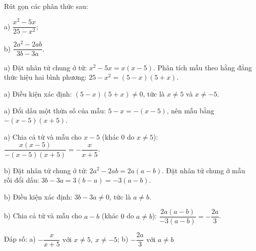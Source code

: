 \begin{problem}[8DS-PS-037]
Rút gọn các phân thức sau:

a) $\dfrac{x^2 - 5x}{25 - x^2}$;

b) $\dfrac{2a^2 - 2ab}{3b - 3a}$.

\begin{solution}
a) Đặt nhân tử chung ở tử: $x^2 - 5x = x(x - 5)$. Phân tích mẫu theo hằng đẳng thức hiệu hai bình phương: $25 - x^2 = (5 - x)(5 + x)$.

a) Điều kiện xác định: $(5 - x)(5 + x) \neq 0$, tức là $x \neq 5$ và $x \neq -5$.

a) Đổi dấu một thừa số của mẫu: $5 - x = -(x - 5)$, nên mẫu bằng $-(x - 5)(x + 5)$.

a) Chia cả tử và mẫu cho $x - 5$ (khác $0$ do $x \neq 5$): $\dfrac{x(x - 5)}{-(x - 5)(x + 5)} = -\dfrac{x}{x + 5}$.

b) Đặt nhân tử chung ở tử: $2a^2 - 2ab = 2a(a - b)$. Đặt nhân tử chung ở mẫu rồi đổi dấu: $3b - 3a = 3(b - a) = -3(a - b)$.

b) Điều kiện xác định: $3b - 3a \neq 0$, tức là $a \neq b$.

b) Chia cả tử và mẫu cho $a - b$ (khác $0$ do $a \neq b$): $\dfrac{2a(a - b)}{-3(a - b)} = -\dfrac{2a}{3}$.

Đáp số: a) $\boxed{-\dfrac{x}{x + 5} \text{ với } x \neq 5,\ x \neq -5}$; b) $\boxed{-\dfrac{2a}{3} \text{ với } a \neq b}$
\end{solution}
\end{problem}

